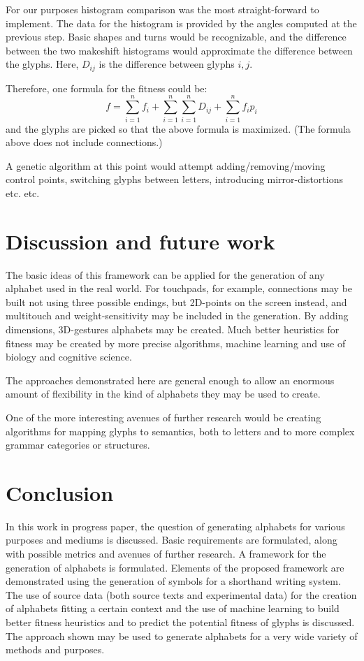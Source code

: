 \documentclass{vgtc}                          %
\begin{document}
For our purposes histogram comparison was the most straight-forward to implement. The data for the histogram is provided by the angles computed at the previous step. Basic shapes and turns would be recognizable, and the difference between the two makeshift histograms would approximate the difference between the glyphs. Here, \(D_{ij}\) is the difference between glyphs \(i, j\).

Therefore, one formula for the fitness could be:
\[
f=\sum^{n}_{i=1}f_i+
\sum^{n}_{i=1}\sum^{n}_{i=1}D_{ij}+
\sum^{n}_{i=1}f_ip_i
\]
and the glyphs are picked so that the above formula is maximized. (The formula above does not include connections.)

A genetic algorithm at this point would attempt adding/removing/moving control points, switching glyphs between letters, introducing mirror-distortions etc. etc.

\section{Discussion and future work}
The basic ideas of this framework can be applied for the generation of any alphabet used in the real world. For touchpads, for example, connections may be built not using three possible endings, but 2D-points on the screen instead, and multitouch and weight-sensitivity may be included in the generation. By adding dimensions, 3D-gestures alphabets may be created. Much better heuristics for fitness may be created by more precise algorithms, machine learning and use of biology and cognitive science. 

The approaches demonstrated here are general enough to allow an enormous amount of flexibility in the kind of alphabets they may be used to create.

One of the more interesting avenues of further research would be creating algorithms for mapping glyphs to semantics, both to letters and to more complex grammar categories or structures. 

\section{Conclusion}
In this work in progress paper, the question of generating alphabets for various purposes and mediums is discussed. Basic requirements are formulated, along with possible metrics and avenues of further research. A framework for the generation of alphabets is formulated. Elements of the proposed framework are demonstrated using the generation of symbols for a shorthand writing system. The use of source data (both source texts and experimental data) for the creation of alphabets fitting a
certain context and the use of machine learning to build better fitness heuristics and to predict the potential fitness of glyphs is discussed. The approach shown may be used to generate alphabets for a very wide variety of methods and purposes.


%

%
%
%


\end{document}
